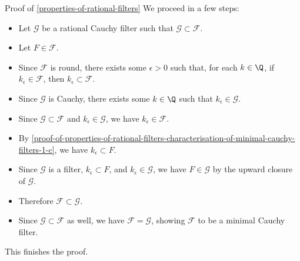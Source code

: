 \begin{Proof}{Proof of \cref{properties-of-rational-filters}}
    We proceed in a few steps:
    \begin{itemize}
        \item Let $\mathcal{G}$ be a rational Cauchy filter such that $\mathcal{G}\subset\mathcal{F}$.
        \item Let $F\in\mathcal{F}$.
        \item Since $\mathcal{F}$ is round, there exists some $\epsilon\greater0$ such that, for each $k\in\Q$, if $k_{\epsilon}\in\mathcal{F}$, then $k_{\epsilon}\subset\mathcal{F}$.
        \item Since $\mathcal{G}$ is Cauchy, there exists some $k\in\Q$ such that $k_{\epsilon}\in\mathcal{G}$.
        \item Since $\mathcal{G}\subset\mathcal{F}$ and $k_{\epsilon}\in\mathcal{G}$, we have $k_{\epsilon}\in\mathcal{F}$.
        \item By \cref{proof-of-properties-of-rational-filters-characterisation-of-minimal-cauchy-filters-1-c}, we have $k_{\epsilon}\subset F$.
        \item Since $\mathcal{G}$ is a filter, $k_{\epsilon}\subset F$, and $k_{\epsilon}\in\mathcal{G}$, we have $F\in\mathcal{G}$ by the upward closure of $\mathcal{G}$.
        \item Therefore $\mathcal{F}\subset\mathcal{G}$.
        \item Since $\mathcal{G}\subset\mathcal{F}$ as well, we have $\mathcal{F}=\mathcal{G}$, showing $\mathcal{F}$ to be a minimal Cauchy filter.
    \end{itemize}
    This finishes the proof.


\end{Proof}
